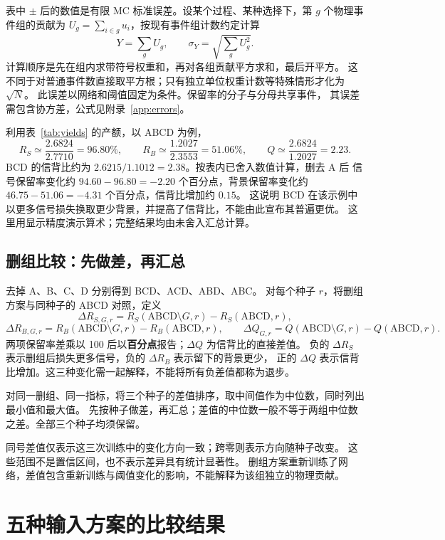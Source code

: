 \documentclass[11pt,a4paper,fontset=fandol,scheme=plain]{ctexart}
\begin{document}
表中 $\pm$ 后的数值是有限 MC 标准误差。设某个过程、某种选择下，第 $g$ 个物理事件组的贡献为
$U_g=\sum_{i\in g}u_i$，按现有事件组计数约定计算
\[
 Y=\sum_g U_g,\qquad \sigma_Y=\sqrt{\sum_g U_g^2}.
\]
计算顺序是先在组内求带符号权重和，再对各组贡献平方求和，最后开平方。
这不同于对普通事件数直接取平方根；只有独立单位权重计数等特殊情形才化为 $\sqrt{N}$。
此误差以网络和阈值固定为条件。保留率的分子与分母共享事件，
其误差需包含协方差，公式见附录~\ref{app:errors}。

利用表~\ref{tab:yields} 的产额，以 ABCD 为例，
\[
 R_S\simeq\frac{2.6824}{2.7710}=96.80\%,\qquad
 R_B\simeq\frac{1.2027}{2.3553}=51.06\%,\qquad
 Q\simeq\frac{2.6824}{1.2027}=2.23.
\]
BCD 的信背比约为 $2.6215/1.1012=2.38$。按表内已舍入数值计算，删去 A 后
信号保留率变化约 $94.60-96.80=-2.20$ 个百分点，背景保留率变化约
$46.75-51.06=-4.31$ 个百分点，信背比增加约 $0.15$。
这说明 BCD 在该示例中以更多信号损失换取更少背景，并提高了信背比，不能由此宣布其普遍更优。
这里用显示精度演示算术；完整结果均由未舍入汇总计算。


\subsection{删组比较：先做差，再汇总}
去掉 A、B、C、D 分别得到 BCD、ACD、ABD、ABC。
对每个种子 $r$，将删组方案与同种子的 ABCD 对照，定义
\[
 \Delta R_{S,G,r}=R_S(\mathrm{ABCD}\setminus G,r)-R_S(\mathrm{ABCD},r),
\]
\[
 \Delta R_{B,G,r}=R_B(\mathrm{ABCD}\setminus G,r)-R_B(\mathrm{ABCD},r),\qquad
 \Delta Q_{G,r}=Q(\mathrm{ABCD}\setminus G,r)-Q(\mathrm{ABCD},r).
\]
两项保留率差乘以 100 后以\textbf{百分点}报告；$\Delta Q$ 为信背比的直接差值。
负的 $\Delta R_S$ 表示删组后损失更多信号，负的 $\Delta R_B$ 表示留下的背景更少，
正的 $\Delta Q$ 表示信背比增加。这三种变化需一起解释，不能将所有负差值都称为退步。

对同一删组、同一指标，将三个种子的差值排序，取中间值作为中位数，同时列出最小值和最大值。
先按种子做差，再汇总；差值的中位数一般不等于两组中位数之差。全部三个种子均须保留。

同号差值仅表示这三次训练中的变化方向一致；跨零则表示方向随种子改变。
这些范围不是置信区间，也不表示差异具有统计显著性。
删组方案重新训练了网络，差值包含重新训练与阈值变化的影响，不能解释为该组独立的物理贡献。


\FloatBarrier
\clearpage
\section{五种输入方案的比较结果}
\end{document}
